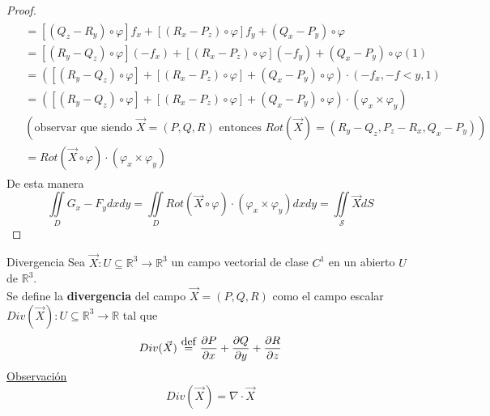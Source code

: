 \documentclass{report}
\newcommand\defeq{\stackrel{\mathclap{\normalfont\mbox{def}}}{~=~}}
\newcommand\reals{\mathds{R}}
\begin{document}
\begin{proof}
\begin{gather*}
\begin{aligned}
					  & = [(Q_z - R_y)\circ\varphi]f_x + [(R_x-P_z)\circ\varphi]f_y+(Q_x-P_y)\circ\varphi \\ 
					  & = [(R_y - Q_z)\circ\varphi](-f_x) + [(R_x-P_z)\circ\varphi](-f_y)+(Q_x-P_y)\circ\varphi (1) \\
					  & = ([(R_y - Q_z)\circ\varphi] + [(R_x-P_z)\circ\varphi] + (Q_x-P_y)\circ\varphi)\cdot (-f_x,-f<y,1) \\
					  & = ([(R_y - Q_z)\circ\varphi] + [(R_x-P_z)\circ\varphi] + (Q_x-P_y)\circ\varphi)\cdot (\varphi_x \times \varphi_y) \\
					  & (\text{observar que siendo }\vec{X} = (P,Q,R) \text{ entonces }Rot(\vec{X})=(R_y-Q_z,P_z-R_x,Q_x-P_y)) \\
					  & = Rot(\vec{X}\circ\varphi )\cdot (\varphi_x \times\varphi_y)
		\end{aligned}
	\end{gather*}
	De esta manera
	\[
		\iint\limits_D{G_x - F_y dxdy} = \iint\limits_D{Rot(\vec{X}\circ\varphi)\cdot (\varphi_x\times\varphi_y)dxdy} = \iint\limits_\mathcal{S}{\vec{X}dS}
	\]
\end{proof}

\begin{defbox}{Divergencia}
	Sea $\vec{X}: U \subseteq \reals^3 \rightarrow \reals^3$ un campo vectorial de clase $C^1$ en un abierto $U$ de $\reals^3$. \\
	Se define la \textbf{divergencia} del campo $\vec{X} = (P,Q,R)$ como el campo escalar $Div(\vec{X}): U \subseteq \reals^3 \rightarrow \reals$ tal que
	\begin{equation}
		Div(\vec{X}) \defeq \frac{\partial{P}}{\partial{x}}+\frac{\partial{Q}}{\partial{y}}+\frac{\partial{R}}{\partial{z}}
		\label{eq:divergencia}
	\end{equation}
	\underline{Observación}
	\[
		Div(\vec{X}) = \nabla \cdot \vec{X}
	\]
\end{defbox}
\end{document}
